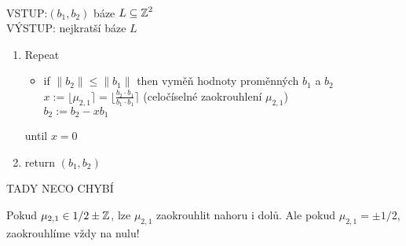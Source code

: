 \begin{definition}\phantom{}\\
VSTUP:$(b_1,b_2)$ báze $L\subseteq\operatorname{\mathbb{Z}}^2$\\
VÝSTUP: nejkratší báze $L$
\begin{enumerate}
    \item Repeat
    \begin{itemize}
        \item if $\|b_2\|\leq \|b_1\|$ then vyměň hodnoty proměnných $b_1$ a $b_2$\\
    $x:=\lfloor\mu_{2,1}\rceil=\lfloor\frac{b_2\cdot b_1}{b_1\cdot b_1}\rceil$ (celočíselné zaokrouhlení $\mu_{2,1}$)\\
    $b_2:=b_2-xb_1$
    \end{itemize}
     until $x=0$
     \item return $(b_1,b_2)$
\end{enumerate}
\end{definition}

TADY NECO CHYBÍ

\begin{note}[Zaokrouhlení]
Pokud $\mu_{2,1}\in 1/2 \pm \operatorname{\mathbb{Z}}$, lze $\mu_{2,1}$ zaokrouhlit nahoru i dolů. Ale pokud $\mu_{2,1}=\pm 1/2$, zaokrouhlíme vždy na nulu!
\end{note}


